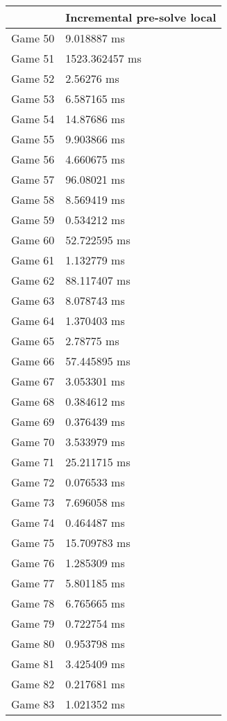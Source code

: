 \begin{multicols}{2}
\begin{tabular}{|l|l|}
	\hline
	& Incremental pre-solve local \\ \hline
	Game 50 & 9.018887 ms \\ \hline
	Game 51 & 1523.362457 ms \\ \hline
	Game 52 & 2.56276 ms \\ \hline
	Game 53 & 6.587165 ms \\ \hline
	Game 54 & 14.87686 ms \\ \hline
	Game 55 & 9.903866 ms \\ \hline
	Game 56 & 4.660675 ms \\ \hline
	Game 57 & 96.08021 ms \\ \hline
	Game 58 & 8.569419 ms \\ \hline
	Game 59 & 0.534212 ms \\ \hline
	Game 60 & 52.722595 ms \\ \hline
	Game 61 & 1.132779 ms \\ \hline
	Game 62 & 88.117407 ms \\ \hline
	Game 63 & 8.078743 ms \\ \hline
	Game 64 & 1.370403 ms \\ \hline
	Game 65 & 2.78775 ms \\ \hline
	Game 66 & 57.445895 ms \\ \hline
	Game 67 & 3.053301 ms \\ \hline
	Game 68 & 0.384612 ms \\ \hline
	Game 69 & 0.376439 ms \\ \hline
	Game 70 & 3.533979 ms \\ \hline
	Game 71 & 25.211715 ms \\ \hline
	Game 72 & 0.076533 ms \\ \hline
	Game 73 & 7.696058 ms \\ \hline
	Game 74 & 0.464487 ms \\ \hline
	Game 75 & 15.709783 ms \\ \hline
	Game 76 & 1.285309 ms \\ \hline
	Game 77 & 5.801185 ms \\ \hline
	Game 78 & 6.765665 ms \\ \hline
	Game 79 & 0.722754 ms \\ \hline
	Game 80 & 0.953798 ms \\ \hline
	Game 81 & 3.425409 ms \\ \hline
	Game 82 & 0.217681 ms \\ \hline
	Game 83 & 1.021352 ms \\ \hline

\end{tabular}
\end{multicols}
